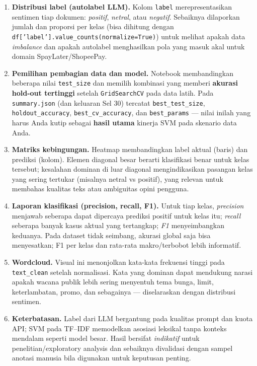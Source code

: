 \documentclass[11pt,a4paper]{article}
\begin{document}
\begin{enumerate}[leftmargin=*]
  \item \textbf{Distribusi label (autolabel LLM).}
  Kolom \texttt{label} merepresentasikan sentimen tiap dokumen: \textit{positif}, \textit{netral}, atau \textit{negatif}.
  Sebaiknya dilaporkan jumlah dan proporsi per kelas (bisa dihitung dengan \texttt{df['label'].value\_counts(normalize=True)}) untuk melihat apakah data \textit{imbalance} dan apakah autolabel menghasilkan pola yang masuk akal untuk domain SpayLater/ShopeePay.

  \item \textbf{Pemilihan pembagian data dan model.}
  Notebook membandingkan beberapa nilai \texttt{test\_size} dan memilih kombinasi yang memberi \textbf{akurasi hold-out tertinggi} setelah \texttt{GridSearchCV} pada data latih.
  Pada \texttt{summary.json} (dan keluaran Sel 30) tercatat \texttt{best\_test\_size}, \texttt{holdout\_accuracy}, \texttt{best\_cv\_accuracy}, dan \texttt{best\_params} --- nilai inilah yang harus Anda kutip sebagai \textbf{hasil utama} kinerja SVM pada skenario data Anda.

  \item \textbf{Matriks kebingungan.}
  Heatmap membandingkan label aktual (baris) dan prediksi (kolom).
  Elemen diagonal besar berarti klasifikasi benar untuk kelas tersebut; kesalahan dominan di luar diagonal mengindikasikan pasangan kelas yang sering tertukar (misalnya netral vs positif), yang relevan untuk membahas kualitas teks atau ambiguitas opini pengguna.

  \item \textbf{Laporan klasifikasi (precision, recall, F1).}
  Untuk tiap kelas, \textit{precision} menjawab seberapa dapat dipercaya prediksi positif untuk kelas itu; \textit{recall} seberapa banyak kasus aktual yang tertangkap; \textit{F1} menyeimbangkan keduanya.
  Pada dataset tidak seimbang, akurasi global saja bisa menyesatkan; F1 per kelas dan rata-rata makro/terbobot lebih informatif.

  \item \textbf{Wordcloud.}
  Visual ini menonjolkan kata-kata frekuensi tinggi pada \texttt{text\_clean} setelah normalisasi.
  Kata yang dominan dapat mendukung narasi apakah wacana publik lebih sering menyentuh tema bunga, limit, keterlambatan, promo, dan sebagainya --- diselaraskan dengan distribusi sentimen.

  \item \textbf{Keterbatasan.}
  Label dari LLM bergantung pada kualitas prompt dan kuota API; SVM pada TF--IDF memodelkan asosiasi leksikal tanpa konteks mendalam seperti model besar.
  Hasil bersifat \textit{indikatif} untuk penelitian/exploratory analysis dan sebaiknya divalidasi dengan sampel anotasi manusia bila digunakan untuk keputusan penting.
\end{enumerate}
\end{document}
